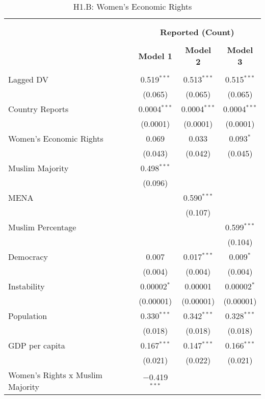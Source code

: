 
\begin{table}[!htbp] \centering 
  \caption{H1.B: Women's Economic Rights} 
  \label{} 
\begin{tabular}{@{\extracolsep{5pt}}lccc} 
\\[-1.8ex]\hline \\[-1.8ex] 
\\[-1.8ex] & \multicolumn{3}{c}{\textbf{Reported (Count)}} \\ 
\\[-1.8ex] & \textbf{Model 1} & \textbf{Model 2} & \textbf{Model 3}\\ 
\hline \\[-1.8ex] 
 Lagged DV & 0.519$^{***}$ & 0.513$^{***}$ & 0.515$^{***}$ \\ 
  & (0.065) & (0.065) & (0.065) \\ 
  Country Reports & 0.0004$^{***}$ & 0.0004$^{***}$ & 0.0004$^{***}$ \\ 
  & (0.0001) & (0.0001) & (0.0001) \\ 
  Women's Economic Rights & 0.069 & 0.033 & 0.093$^{*}$ \\ 
  & (0.043) & (0.042) & (0.045) \\ 
  Muslim Majority & 0.498$^{***}$ &  &  \\ 
  & (0.096) &  &  \\ 
  MENA &  & 0.590$^{***}$ &  \\ 
  &  & (0.107) &  \\ 
  Muslim Percentage &  &  & 0.599$^{***}$ \\ 
  &  &  & (0.104) \\ 
  Democracy & 0.007 & 0.017$^{***}$ & 0.009$^{*}$ \\ 
  & (0.004) & (0.004) & (0.004) \\ 
  Instability & 0.00002$^{*}$ & 0.00001 & 0.00002$^{*}$ \\ 
  & (0.00001) & (0.00001) & (0.00001) \\ 
  Population & 0.330$^{***}$ & 0.342$^{***}$ & 0.328$^{***}$ \\ 
  & (0.018) & (0.018) & (0.018) \\ 
  GDP per capita & 0.167$^{***}$ & 0.147$^{***}$ & 0.166$^{***}$ \\ 
  & (0.021) & (0.022) & (0.021) \\ 
  Women's Rights x Muslim Majority & $-$0.419$^{***}$ &  &  \\ 

\end{tabular}
\end{table}
